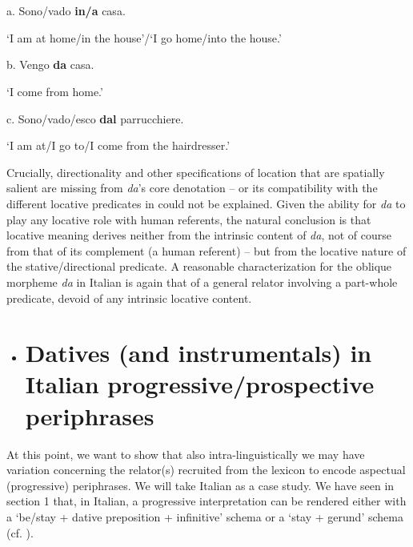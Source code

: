\documentclass[output=paper]{langsci/langscibook}
\begin{document}
\ea%
    \label{ex:key:20}
    \gll\\
        \\
    \glt
    \z

           a.   Sono/vado   \textbf{in/a}   casa.  

‘I am at home/in the house’/‘I go home/into the house.’ 

b.   Vengo \textbf{da}   casa. 

‘I come from home.’ 

c.   Sono/vado/esco \textbf{dal} parrucchiere. 

‘I am at/I go to/I come from the hairdresser.’

Crucially, directionality and other specifications of location that are spatially salient are missing from \textit{da}’s core denotation – or its compatibility with the different locative predicates in  could not be explained. Given the ability for \textit{da} to play any locative role with human referents, the natural conclusion is that locative meaning derives neither from the intrinsic content of \textit{da}, not of course from that of its complement (a human referent) – but from the locative nature of the stative/directional predicate. A reasonable characterization for the oblique morpheme \textit{da} in Italian is again that of a general relator involving a part-whole predicate, devoid of any intrinsic locative content.
 

\begin{itemize}
\item \section{Datives (and instrumentals) in Italian progressive/prospective periphrases}
\end{itemize}

At this point, we want to show that also intra-linguistically we may have variation concerning the relator(s) recruited from the lexicon to encode aspectual (progressive) periphrases. We will take Italian as a case study. We have seen in section 1 that, in Italian, a progressive interpretation can be rendered either with a ‘be/stay + dative preposition + infinitive’ schema  or a ‘stay + gerund’  schema (cf. \citealt{Bertinetto2000}). 
\end{document}
